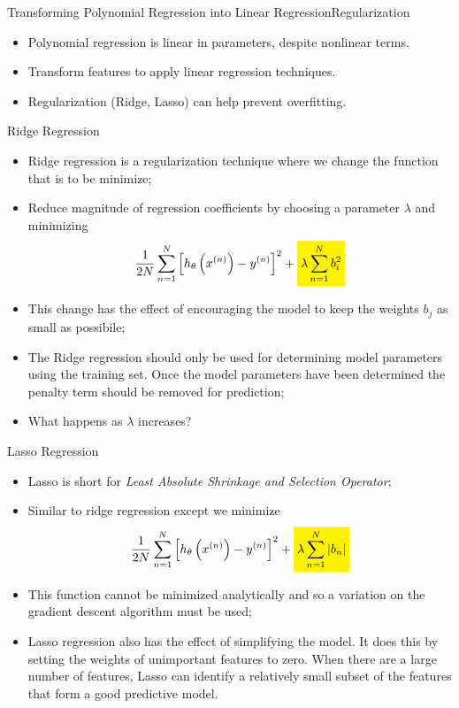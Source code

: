 \documentclass[11pt]{beamer}
\newcommand{\highlight}[1]{%
  \colorbox{yellow!100}{$\displaystyle#1$}}
\begin{document}
%
%
\begin{frame}{Transforming Polynomial Regression into Linear Regression}{Regularization}
    \begin{itemize}
        \item Polynomial regression is linear in parameters, despite nonlinear terms.
        \item Transform features to apply linear regression techniques.
        \item Regularization (Ridge, Lasso) can help prevent overfitting.
    \end{itemize}
\end{frame}
%
%
\begin{frame}{Ridge Regression}
	\begin{itemize}
\item Ridge regression is a regularization technique where we change the function that is to be minimize;	
		\item Reduce magnitude of regression coefficients by choosing a parameter $\lambda$ and minimizing
		\begin{equation}
		\frac{1}{2N} \sum\limits_{n=1}^N \left[h_\theta \left( x^{(n)} \right) - y ^{(n)}\right]^2	+ \highlight{\lambda \sum\limits_{n=1}^N b_i^2}
		\end{equation}
		\item This change has the effect of encouraging the model to keep the weights $b_j$ as small as possibile;
		\item The Ridge regression should only be used for determining model parameters using the training set. Once the model parameters have been determined the penalty term should be removed for prediction;
		\item What happens as $\lambda$ increases?
	\end{itemize}
\end{frame}
\begin{frame}{Lasso Regression}
	\begin{itemize}
	\item Lasso is short for \textit{Least Absolute Shrinkage and Selection Operator};
		\item Similar to ridge regression except we minimize
		\begin{equation}
		\frac{1}{2N} \sum\limits_{n=1}^N \left[h_\theta \left( x^{(n)} \right) - y ^{(n)}\right]^2 + \highlight{\lambda \sum\limits_{n=1}^N \vert b_n \vert}
		\end{equation}
		\item This function cannot be minimized analytically and so a variation on the gradient descent algorithm must be used;
		\item Lasso regression also has the effect of simplifying the model. It does this by setting the weights of unimportant features to zero. When there are a large number of features, Lasso can identify a relatively small subset of the features that form a good predictive model.
	\end{itemize}
\end{frame}
\end{document}
